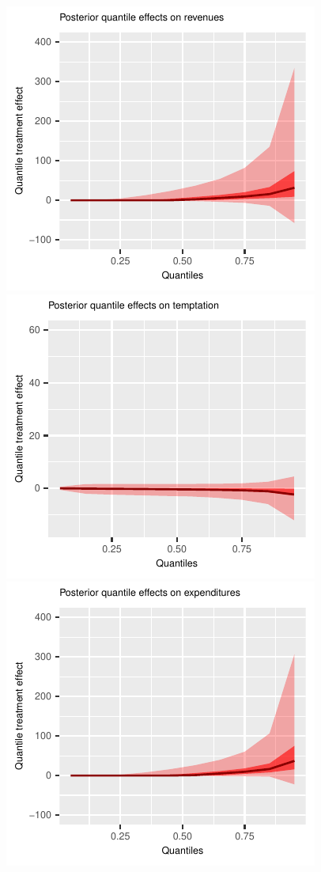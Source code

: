 \documentclass[AER]{AEA}
\begin{document}
\begin{figure}[h!]
        \includegraphics{posterior_parent_quantile_TEs_revenues_lognormal.pdf}\\
    \includegraphics{posterior_parent_quantile_TEs_temptation_lognormal.pdf}
        \includegraphics{posterior_parent_quantile_TEs_expenditures_lognormal.pdf}

\end{figure}
\end{document}
